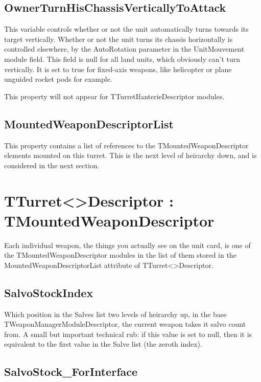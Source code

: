 \documentclass{article}
\begin{document}
\subsection{OwnerTurnHisChassisVerticallyToAttack}

This variable controls whether or not the unit automatically turns towards its target vertically. Whether or not the unit turns its chassis horizontally is controlled elsewhere, by the AutoRotation parameter in the UnitMouvement module field. This field is null for all land units, which obviously can't turn vertically. It is set to true for fixed-axis weapons, like helicopter or plane unguided rocket pods for example.

This property will not appear for TTurretIfanterieDescriptor modules.

\subsection{MountedWeaponDescriptorList}

This property contains a list of references to the TMountedWeaponDescriptor elements mounted on this turret. This is the next level of heirarchy down, and is considered in the next section.

\section{TTurret\textless *\textgreater Descriptor : TMountedWeaponDescriptor}

Each individual weapon, the things you actually see on the unit card, is one of the TMountedWeaponDescriptor modules in the list of them stored in the MountedWeaponDescriptorList attribute of TTurret\textless *\textgreater Descriptor.

\subsection{SalvoStockIndex}

Which position in the Salves list two levels of heirarchy up, in the base TWeaponManagerModuleDescriptor, the current weapon takes it salvo count from. A small but important technical rub: if this value is set to null, then it is equivalent to the first value in the Salve list (the zeroth index).

\subsection{SalvoStock\_ForInterface}
\end{document}
